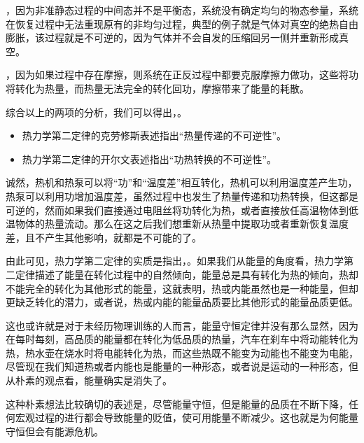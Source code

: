 ，因为非准静态过程的中间态并不是平衡态，系统没有确定均匀的物态参量，系统在恢复过程中无法重现原有的非均匀过程，典型的例子就是气体对真空的绝热自由膨胀，该过程就是不可逆的，因为气体并不会自发的压缩回另一侧并重新形成真空。

，因为如果过程中存在摩擦，则系统在正反过程中都要克服摩擦力做功，这些将功将转化为热量，而热量无法完全的转化回功，摩擦带来了能量的耗散。

综合以上的两项的分析，我们可以得出，。

\begin{itemize}
    \item 热力学第二定律的克劳修斯表述指出“热量传递的不可逆性”。
    \item 热力学第二定律的开尔文表述指出“功热转换的不可逆性”。
\end{itemize}

诚然，热机和热泵可以将“功”和“温度差”相互转化，热机可以利用温度差产生功，热泵可以利用功增加温度差，虽然过程中也发生了热量传递和功热转换，但这都是可逆的，然而如果我们直接通过电阻丝将功转化为热，或者直接放任高温物体到低温物体的热量流动。那么在这之后我们想重新从热量中提取功或者重新恢复温度差，且不产生其他影响，就都是不可能的了。

由此可见，热力学第二定律的实质是指出，。如果我们从能量的角度看，热力学第二定律描述了能量在转化过程中的自然倾向，能量总是具有转化为热的倾向，热却不能完全的转化为其他形式的能量，这就表明，热或内能虽然也是一种能量，但却更缺乏转化的潜力，或者说，热或内能的能量品质要比其他形式的能量品质更低。

这也或许就是对于未经历物理训练的人而言，能量守恒定律并没有那么显然，因为在每时每刻，高品质的能量都在转化为低品质的热量，汽车在刹车中将动能转化为热，热水壶在烧水时将电能转化为热，而这些热既不能变为动能也不能变为电能，尽管现在我们知道热或者内能也是能量的一种形态，或者说是运动的一种形态，但从朴素的观点看，能量确实是消失了。

这种朴素想法比较确切的表述是，尽管能量守恒，但是能量的品质在不断下降，任何宏观过程的进行都会导致能量的贬值，使可用能量不断减少。这也就是为何能量守恒但会有能源危机。




